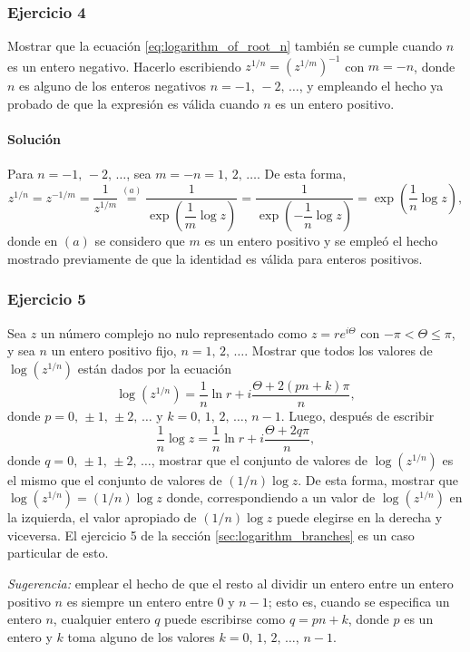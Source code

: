 \documentclass[a4paper]{report}
\begin{document}
\subsubsection{Ejercicio 4}

Mostrar que la ecuación \ref{eq:logarithm_of_root_n} también se cumple cuando \(n\) es un entero negativo. Hacerlo escribiendo \(z^{1/n}=(z^{1/m})^{-1}\) con \(m=-n\), donde \(n\) es alguno de los enteros negativos \(n=-1,\,-2,\,\dots\), y empleando el hecho ya probado de que la expresión es válida cuando \(n\) es un entero positivo. 

\paragraph{Solución} Para \(n=-1,\,-2,\,\dots\), sea \(m=-n=1,\,2,\,\dots\). De esta forma,
\[
 z^{1/n}=z^{-1/m}=\frac{1}{z^{1/m}}\overset{(a)}{=}\dfrac{1}{\exp\left(\dfrac{1}{m}\log z\right)}=\dfrac{1}{\exp\left(-\dfrac{1}{n}\log z\right)}=\exp\left(\frac{1}{n}\log z\right),
\]
donde en \((a)\) se considero que \(m\) es un entero positivo y se empleó el hecho mostrado previamente de que la identidad es válida para enteros positivos.

\subsubsection{Ejercicio 5}

Sea \(z\) un número complejo no nulo representado como \(z=re^{i\Theta}\) con \(-\pi<\Theta\leq\pi\), y sea \(n\) un entero positivo fijo, \(n=1,\,2,\,\dots\). Mostrar que todos los valores de \(\log(z^{1/n})\) están dados por la ecuación
\[
 \log(z^{1/n})=\frac{1}{n}\ln r+i\frac{\Theta+2(pn+k)\pi}{n},
\]
donde \(p=0,\,\pm1,\,\pm2,\,\dots\) y \(k=0,\,1,\,2,\,\dots,\,n-1\). Luego, después de escribir
\[
 \frac{1}{n}\log z=\frac{1}{n}\ln r+i\frac{\Theta+2q\pi}{n},
\]
donde \(q=0,\,\pm1,\,\pm2,\,\dots\), mostrar que el conjunto de valores de \(\log(z^{1/n})\) es el mismo que el conjunto de valores de \((1/n)\log z\). De esta forma, mostrar que \(\log(z^{1/n})=(1/n)\log z\) donde, correspondiendo a un valor de \(\log(z^{1/n})\) en la izquierda, el valor apropiado de \((1/n)\log z\) puede elegirse en la derecha y viceversa. El ejercicio 5 de la sección \ref{sec:logarithm_branches} es un caso particular de esto. 

\emph{Sugerencia:} emplear el hecho de que el resto al dividir un entero entre un entero positivo \(n\) es siempre un entero entre 0 y \(n-1\); esto es, cuando se especifica un entero \(n\), cualquier entero \(q\) puede escribirse como \(q=pn+k\), donde \(p\) es un entero y \(k\) toma alguno de los valores \(k=0,\,1,\,2,\,\dots,\,n-1\).
\end{document}
